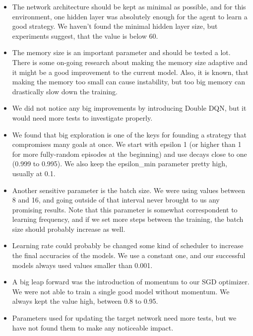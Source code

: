 \documentclass{article}
\begin{document}
\begin{itemize}
\item The network architecture should be kept as minimal as possible, and for this environment, one hidden layer was absolutely enough for the agent to learn a good strategy. We haven't found the minimal hidden layer size, but experiments suggest, that the value is below 60.

\item The memory size is an important parameter and should be tested a lot. There is some on-going research about making the memory size adaptive and it might be a good improvement to the current model. Also, it is known, that making the memory too small can cause instability, but too big memory can drastically slow down the training.

\item We did not notice any big improvements by introducing Double DQN, but it would need more tests to investigate properly.

\item We found that big exploration is one of the keys for founding a strategy that compromises many goals at once. We start with epsilon 1 (or higher than 1 for more fully-random episodes at the beginning) and use decays close to one (0.999 to 0.995). We also keep the epsilon\_min parameter pretty high, usually at 0.1. 

\item Another sensitive parameter is the batch size. We were using values between 8 and 16, and going outside of that interval never brought to us any promising results. Note that this parameter is somewhat correspondent to learning frequency, and if we set more steps between the training, the batch size should probably increase as well.

\item Learning rate could probably be changed some kind of scheduler to increase the final accuracies of the models. We use a constant one, and our successful models always used values smaller than 0.001.

\item A big leap forward was the introduction of momentum to our SGD optimizer. We were not able to train a single good model without momentum. We always kept the value high, between 0.8 to 0.95.

\item Parameters used for updating the target network need more tests, but we have not found them to make any noticeable impact.

\end{itemize}
\end{document}
